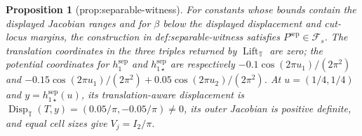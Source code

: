 \documentclass{article}
\newtheorem{proposition}{Proposition}
\begin{document}
\begin{proposition}[prop:separable-witness]\label{prop:separable-witness}
For constants whose bounds contain the displayed Jacobian ranges and for \(\beta\) below the displayed displacement and cut-locus margins, the construction in def:separable-witness satisfies \(P^{\mathrm{sep}}\in\mathcal F_s\). The translation coordinates in the three triples returned by \(\operatorname{Lift}_{\mathbb T}\) are zero; the potential coordinates for \(h_1^{\mathrm{sep}}\) and \(h_{1\star}^{\mathrm{sep}}\) are respectively \(-0.1\cos(2\pi u_1)/(2\pi^2)\) and \(-0.15\cos(2\pi u_1)/(2\pi^2)+0.05\cos(2\pi u_2)/(2\pi^2)\). At \(u=(1/4,1/4)\) and \(y=h_{1\star}^{\mathrm{sep}}(u)\), its translation-aware displacement is \(\operatorname{Disp}_{\mathbb T}(T,y)=(0.05/\pi,-0.05/\pi)\neq0\), its outer Jacobian is positive definite, and equal cell sizes give \(V_j=I_2/\pi\).
\end{proposition}
\end{document}
